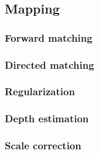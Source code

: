 \subsection{Mapping}

\subsubsection{Forward matching}

\subsubsection{Directed matching}

\subsubsection{Regularization}

\subsubsection{Depth estimation}

\subsubsection{Scale correction}